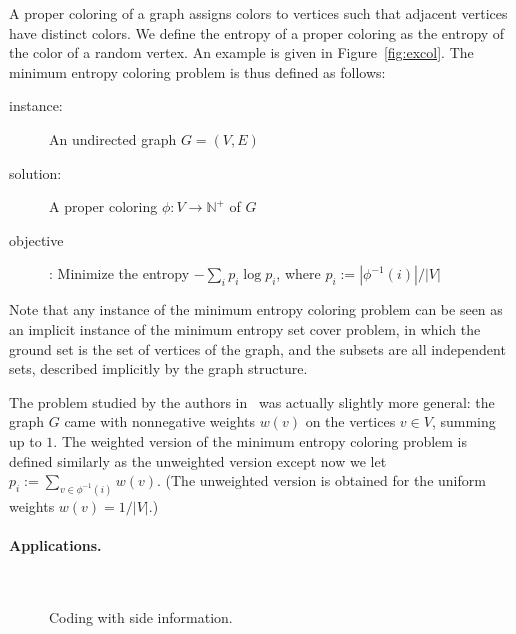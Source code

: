 \documentclass[10pt,a4paper]{article}
\begin{document}
A proper coloring of a graph assigns colors to vertices such that adjacent vertices have distinct colors. We define the entropy of a proper coloring as the entropy of the color of a random vertex. An example is given in Figure~\ref{fig:excol}. The minimum entropy coloring problem is thus defined as follows:
\begin{description}
\item[\sc instance:] An undirected graph $G=(V,E)$ 
\item[\sc solution:] A proper coloring $\phi : V\to \mathbb{N}^{+}$ of $G$ 
\item[\sc objective]: Minimize the entropy $- \sum_i p_i \log p_i$, where $p_i := |\phi^{-1}(i)| / |V|$
\end{description}

Note that any instance of the minimum entropy coloring problem can be seen as an implicit instance of the minimum entropy set cover problem, in which the ground set is the set of vertices of the graph, and the subsets are all independent sets, described implicitly by the graph structure.\medskip

The problem studied by the authors in~\cite{CFJ07} was actually slightly more general: the graph $G$ came with nonnegative weights $w(v)$ on the vertices $v \in V$, summing up to $1$. The weighted version of the minimum entropy coloring problem is defined similarly as the unweighted version except now we let $p_i := \sum_{v\in\phi^{-1}(i)} w(v)$. (The unweighted version is obtained for the uniform weights $w(v) = 1/|V|$.)

\paragraph{Applications.}

\begin{figure}
\begin{center}
\ \\
\hspace{2cm}
\end{center}
\caption{Coding with side information.}
\end{figure}
\end{document}
